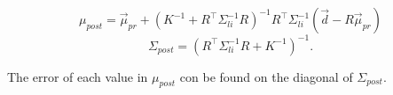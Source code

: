 $$
\mu_{post}= \vec{\mu}_{pr} + (K^{-1} + R^{\top} \Sigma_{li}^{-1} R)^{-1} R^{\top} \Sigma_{li}^{-1} (\vec{d} - R \vec{\mu}_{pr})
$$
$$
\Sigma_{post} = \left(R^\top \Sigma_{li}^{-1} R + K^{-1}\right)^{-1}.
$$

The error of each value in $\mu_{post}$ con be found on the diagonal of $\Sigma_{post}$.
